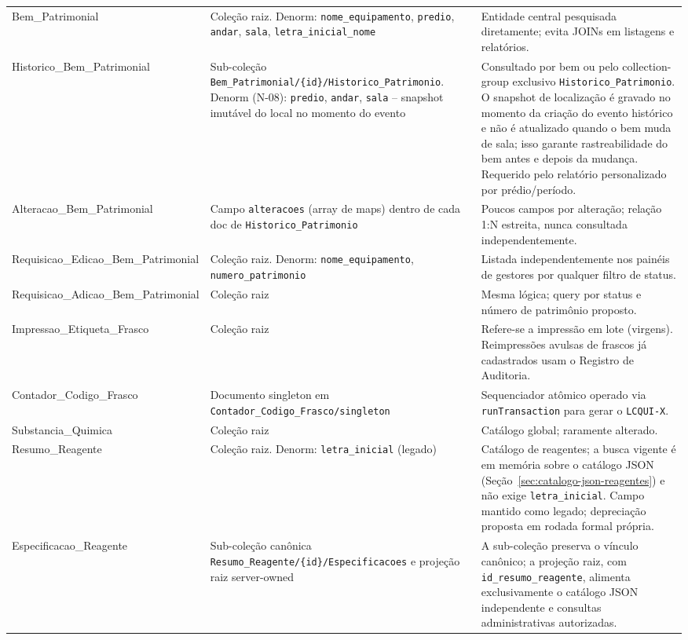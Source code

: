 \begin{longtable}{>{\raggedright\arraybackslash}p{} >{\raggedright\arraybackslash}p{} >{\raggedright\arraybackslash}p{}}
Bem\_Patrimonial & Coleção raiz. Denorm: \texttt{nome\_equipamento}, \texttt{predio}, \texttt{andar}, \texttt{sala}, \texttt{letra\_inicial\_nome} & Entidade central pesquisada diretamente; evita JOINs em listagens e relatórios.\\
Historico\_Bem\_Patrimonial & Sub-coleção \nolinkurl{Bem\_Patrimonial/\{id\}/Historico\_Patrimonio}. Denorm (N-08): \texttt{predio}, \texttt{andar}, \texttt{sala} -- snapshot imutável do local no momento do evento & Consultado por bem ou pelo collection-group exclusivo \texttt{Historico\_Patrimonio}. O snapshot de localização é gravado no momento da criação do evento histórico e não é atualizado quando o bem muda de sala; isso garante rastreabilidade do bem antes e depois da mudança. Requerido pelo relatório personalizado por prédio/período.\\
Alteracao\_Bem\_Patrimonial & Campo \texttt{alteracoes} (array de maps) dentro de cada doc de \texttt{Historico\_Patrimonio} & Poucos campos por alteração; relação 1:N estreita, nunca consultada independentemente.\\
Requisicao\_Edicao\_Bem\_Patrimonial & Coleção raiz. Denorm: \texttt{nome\_equipamento}, \texttt{numero\_patrimonio} & Listada independentemente nos painéis de gestores por qualquer filtro de status.\\
Requisicao\_Adicao\_Bem\_Patrimonial & Coleção raiz & Mesma lógica; query por status e número de patrimônio proposto.\\
Impressao\_Etiqueta\_Frasco & Coleção raiz & Refere-se a impressão em lote (virgens). Reimpressões avulsas de frascos já cadastrados usam o Registro de Auditoria.\\
Contador\_Codigo\_Frasco & Documento singleton em \nolinkurl{Contador\_Codigo\_Frasco/singleton} & Sequenciador atômico operado via \texttt{runTransaction} para gerar o \texttt{LCQUI-X}.\\
Substancia\_Quimica & Coleção raiz & Catálogo global; raramente alterado.\\
Resumo\_Reagente & Coleção raiz. Denorm: \texttt{letra\_inicial} (legado) & Catálogo de reagentes; a busca vigente é em memória sobre o catálogo JSON (Seção~\ref{sec:catalogo-json-reagentes}) e não exige \texttt{letra\_inicial}. Campo mantido como legado; depreciação proposta em rodada formal própria.\\
Especificacao\_Reagente & Sub-coleção canônica \nolinkurl{Resumo\_Reagente/\{id\}/Especificacoes} e projeção raiz server-owned & A sub-coleção preserva o vínculo canônico; a projeção raiz, com \texttt{id\_resumo\_reagente}, alimenta exclusivamente o catálogo JSON independente e consultas administrativas autorizadas.\\

\end{longtable}
